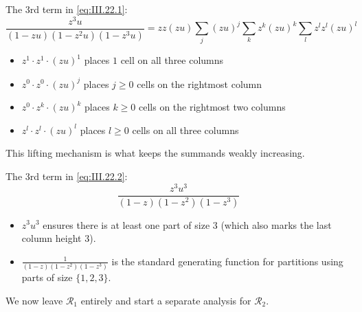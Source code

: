 The 3rd term in \eqref{eq:III.22.1}:
\begin{equation*}
    \frac{z^{3}u}{(1 - zu)(1 - z^{2}u)(1 - z^{3}u)} = zz(zu)\sum_{j}(zu)^{j} \sum_{k} z^{k}(zu)^{k} \sum_{l} z^{l}z^{l}(zu)^{l}
\end{equation*}
\begin{itemize}
    \item $z^{1} \cdot z^{1} \cdot (zu)^{1}$ places $1$ cell on all three columns
    \item $z^{0} \cdot z^{0} \cdot (zu)^{j}$ places $j \geq 0$ cells on the rightmost column
    \item $z^{0} \cdot z^{k} \cdot (zu)^{k}$ places $k \geq 0$ cells on the rightmost two columns
    \item $z^{l} \cdot z^{l} \cdot (zu)^{l}$ places $l \geq 0$ cells on all three columns
\end{itemize}
This lifting mechanism is what keeps the summands weakly increasing.

The 3rd term in \eqref{eq:III.22.2}:
\begin{equation*}
    \frac{z^{3}u^{3}}{(1 - z)(1 - z^{2})(1 - z^{3})}
\end{equation*}
\begin{itemize}
    \item $z^{3}u^{3}$ ensures there is at least one part of size $3$ (which also marks the last column height $3$).
    \item $\frac{1}{(1 - z)(1 - z^{2})(1 - z^{3})}$ is the standard generating function for partitions using parts of size $\{1, 2, 3\}$.
\end{itemize}

We now leave $\mathcal{R}_{1}$ entirely and start a separate analysis for $\mathcal{R}_{2}$.

